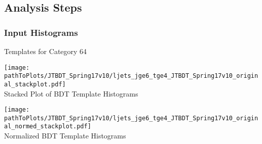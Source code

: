 \subsection{Analysis Steps}

\subsubsection{Input Histograms}
\begin{frame}{Templates for Category 64}

\begin{minipage}{0.48\textwidth}
\begin{center}
\texttt{[image: \\pathToPlots/JTBDT\_Spring17v10/ljets\_jge6\_tge4\_JTBDT\_Spring17v10\_original\_stackplot.pdf]}\label{fig::stackPlot64}\\
Stacked Plot of BDT Template Histograms

\end{center}
\end{minipage}
\begin{minipage}{0.48\textwidth}
\begin{center}
\texttt{[image: \\pathToPlots/JTBDT\_Spring17v10/ljets\_jge6\_tge4\_JTBDT\_Spring17v10\_original\_normed\_stackplot.pdf]}\label{fig::normed_stackPlot64}\\
Normalized BDT Template Histograms

\end{center}

\end{minipage}



\end{frame}
